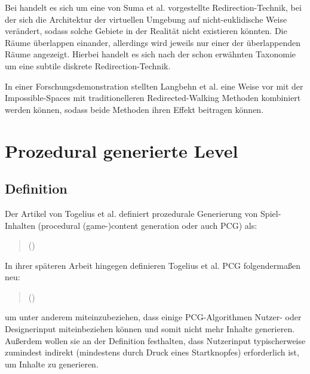Bei  handelt es sich um eine von
Suma et al. \cite{impossible-spaces-suma} vorgestellte Redirection-Technik, bei der sich die Architektur der virtuellen Umgebung auf nicht-euklidische Weise verändert, sodass solche Gebiete in der Realität nicht existieren könnten.
Die Räume überlappen einander, allerdings wird jeweils nur einer der überlappenden Räume angezeigt. Hierbei handelt es sich nach der schon erwähnten Taxonomie um eine subtile diskrete Redirection-Technik.

In einer Forschungsdemonstration \cite{redirected-spaces} stellten Langbehn et al. eine Weise vor mit der Impossible-Spaces mit traditionelleren Redirected-Walking Methoden kombiniert werden können, sodass beide Methoden ihren Effekt beitragen können.

\section{Prozedural generierte Level}

\subsection{Definition}

Der Artikel \cite{sbpcg} von Togelius et al. definiert prozedurale Generierung von Spiel-Inhalten (procedural (game-)content generation oder auch PCG) als:

\begin{quotation}
\end{quotation}

\begin{quotation}
    ()
\end{quotation}

In ihrer späteren Arbeit hingegen \cite{what-is-pcg} definieren Togelius et al. PCG folgendermaßen neu:
\begin{quotation}
\end{quotation}

\begin{quotation}
    ()
\end{quotation}
um unter anderem miteinzubeziehen, dass einige PCG-Algorithmen Nutzer- oder Designerinput miteinbeziehen können und somit nicht mehr  Inhalte generieren. Außerdem wollen sie an der Definition festhalten, dass Nutzerinput typischerweise zumindest indirekt (mindestens durch Druck eines Startknopfes) erforderlich ist, um Inhalte zu generieren.

